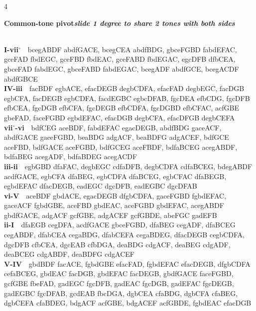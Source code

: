 \documentclass[letterpaper,12pt]{article}
\begin{document}
\begin{multicols}{4}
\noindent\colorbox{hdr1}{\begin{minipage}{\dimexpr\linewidth-2\fboxsep\relax}\raggedright\color{white}\bfseries Common-tone pivot\quad\normalfont\itshape slide 1 degree to share 2 tones with both sides\end{minipage}}\\[0.1mm]
\noindent\hangindent=0.25in {\color{lhcol}\bfseries I-vii$^\circ$}~~{\ttfamily bcegABDF abdfGACE, bcegCEA abdfBDG, gbceFGBD fabdEFAC, gceFAD fbdEGC, gceFBD fbdEAC, gceFABD fbdEGAC, egcDFB dfbCEA, gbceFAD fabdEGC, gbceFABD fabdEGAC, bcegADF abdfGCE, bcegACDF abdfGBCE}\\[0.1mm]
\noindent\hangindent=0.25in {\color{lhcol}\bfseries IV-iii}~~{\ttfamily facBDF egbACE, efacDEGB degbCDFA, efacFAD degbEGC, facDGB egbCFA, facDEGB egbCDFA, facdEGBC egbcDFAB, fgcDEA efbCDG, fgcDFB efbCEA, fgcDGB efbCFA, fgcDEGB efbCDFA, fgcDGBD efbCFAC, acfGBE gbeFAD, faceFGBD egbdEFAC, efacDGB degbCFA, efacDFGB degbCEFA}\\[0.1mm]
\noindent\hangindent=0.25in {\color{lhcol}\bfseries vii$^\circ$-vi}~~{\ttfamily bdfCEG aceBDF, fabdEFAC egacDEGB, abdfBDG gaceACF, abdfGACE gaceFGBD, beaBDG adgACF, beaBDFG adgACEF, bdfGCE aceFBD, bdfGACE aceFGBD, bdfGCEG aceFBDF, bdfaBCEG acegABDF, bdfaBEG acegADF, bdfaBDEG acegACDF}\\[0.1mm]
\noindent\hangindent=0.25in {\color{lhcol}\bfseries iii-ii}~~{\ttfamily egbGBD dfaFAC, degbEGC cdfaDFB, degbCDFA cdfaBCEG, bdegABDF acdfGACE, egbCFA dfaBEG, egbCDFA dfaBCEG, egbCFAC dfaBEGB, egbdEFAC dfacDEGB, eadEGC dgcDFB, eadEGBC dgcDFAB}\\[0.1mm]
\noindent\hangindent=0.25in {\color{lhcol}\bfseries vi-V}~~{\ttfamily aceBDF gbdACE, egacDEGB dfgbCDFA, gaceFGBD fgbdEFAC, gaceACF fgbdGBE, aceFBD gbdEAC, aceFGBD gbdEFAC, acegABDF gbdfGACE, adgACF gcfGBE, adgACEF gcfGBDE, abeFGC gadEFB}\\[0.1mm]
\noindent\hangindent=0.25in {\color{lhcol}\bfseries ii-I}~~{\ttfamily dfaEGB cegDFA, acdfGACE gbceFGBD, dfaBEG cegADF, dfaBCEG cegABDF, dfabCEA cegaBDG, dfabCEFA cegaBDEG, dfacDEGB cegbCDFA, dgcDFB cfbCEA, dgcEAB cfbDGA, deaBDG cdgACF, deaBEG cdgADF, deaBCEG cdgABDF, deaBDFG cdgACEF}\\[0.1mm]
\noindent\hangindent=0.25in {\color{lhcol}\bfseries V-IV}~~{\ttfamily gbdBDF facACE, fgbdGBE efacFAD, fgbdEFAC efacDEGB, dfgbCDFA cefaBCEG, gbdEAC facDGB, gbdEFAC facDEGB, gbdfGACE faceFGBD, gcfGBE fbeFAD, gadEGC fgcDFB, gadEAC fgcDGB, gadEFAC fgcDEGB, gadEGBC fgcDFAB, gcdEAB fbcDGA, dgbCEA cfaBDG, dgbCFA cfaBEG, dgbCEFA cfaBDEG, bdgACF acfGBE, bdgACEF acfGBDE, fgbdEAC efacDGB}\\[0.1mm]
\vspace{1.5mm}


\end{multicols}
\end{document}
